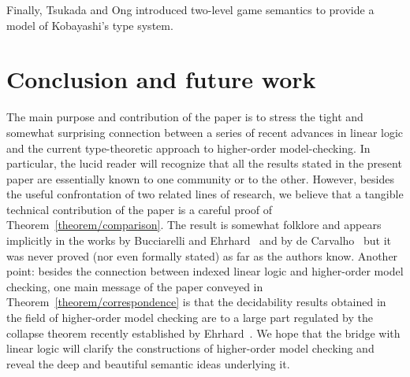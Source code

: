 \documentclass{eptcs}
\begin{document}
Finally, Tsukada and Ong \cite{ong-tsukada} introduced two-level game semantics to provide a model of Kobayashi's type system.




\section{Conclusion and future work}
The main purpose and contribution of the paper is to stress the tight and somewhat surprising connection
between a series of recent advances in linear logic
and the current type-theoretic approach to higher-order model-checking.
In particular, 
the lucid reader will recognize that all the results stated in the present paper
are essentially known to one community or to the other.
However, besides the useful confrontation of two related lines of research, we believe
that a tangible technical contribution of the paper is a careful proof of Theorem~\ref{theorem/comparison}.
The result is somewhat folklore and appears implicitly in the works by Bucciarelli and Ehrhard~\cite{ill1,ill2}
and by de Carvalho~\cite{carvalho} but it was never proved (nor even formally stated) as far as the authors know.
Another point: besides the connection between indexed linear logic and higher-order model checking,
one main message of the paper conveyed in Theorem~\ref{theorem/correspondence}
is that the decidability results obtained in the field of higher-order model checking
are to a large part regulated by the collapse theorem recently established by Ehrhard~\cite{ehrhard-collapse,ehrhard-collapse-2}.
We hope that the bridge with linear logic will clarify the constructions of higher-order model checking 
and reveal the deep and beautiful semantic ideas underlying it.




\end{document}
